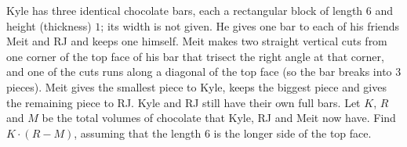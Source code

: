 Kyle has three identical chocolate bars, each a rectangular block of length $6$ and height (thickness) $1$; its width is not given. He gives one bar to each of his friends Meit and RJ and keeps one himself. Meit makes two straight vertical cuts from one corner of the top face of his bar that trisect the right angle at that corner, and one of the cuts runs along a diagonal of the top face (so the bar breaks into $3$ pieces). Meit gives the smallest piece to Kyle, keeps the biggest piece and gives the remaining piece to RJ. Kyle and RJ still have their own full bars. Let $K$, $R$ and $M$ be the total volumes of chocolate that Kyle, RJ and Meit now have. Find $K\cdot(R-M)$, assuming that the length $6$ is the longer side of the top face.
